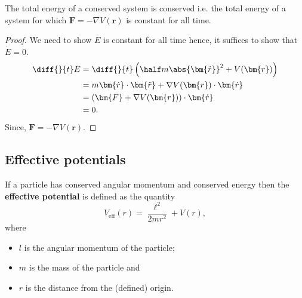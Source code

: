 \documentclass[12pt, a4paper]{article}
\begin{document}
\begin{mdthm}
    The total energy of a conserved system is conserved i.e. the total energy of a system for which \(\bm{F}=-\nabla V(\bm{r})\) is constant for all time.
\end{mdthm}

\begin{proof}
    We need to show \(E\) is constant for all time hence, it suffices to show that \(\dot{E}=0\).
    \[\begin{aligned}
        \diff{}{t} E &= \diff{}{t} \left( \half m \abs{\bm{\dot{r}}}^2 +V(\bm{r}) \right) \\
        &= m \bm{\dot{r}} \cdot \bm{\ddot{r}} + \nabla V(\bm{r}) \cdot \bm{\dot{r}} \\
        &= \left( \bm{F} + \nabla V(\bm{r}) \right) \cdot \bm{\dot{r}} \\
        &= 0.
    \end{aligned}\]
    Since, \(\bm{F}=-\nabla V(\bm{r})\).
\end{proof}

\subsection{Effective potentials}

\begin{definition}
    If a particle has conserved angular momentum and conserved energy then the \textbf{effective potential} is defined as the quantity
    \[V_{\text{eff}}(r) = \frac{\ell^2}{2mr^2}+V(r),\]
    where
    \begin{itemize}
        \item \(l\) is the angular momentum of the particle;
        \item \(m\) is the mass of the particle and 
        \item \(r\) is the distance from the (defined) origin.
    \end{itemize}
\end{definition}
\end{document}
